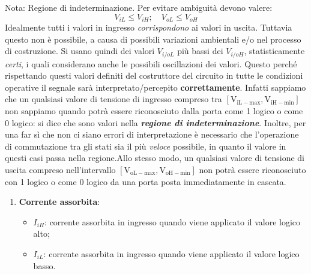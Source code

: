 \documentclass[
]{book}
\providecommand{\tightlist}{%
  \setlength{\itemsep}{0pt}\setlength{\parskip}{0pt}}
\begin{document}
\begin{orangebox}{Nota: Regione di indeterminazione.}
Per evitare ambiguità devono valere:
$$
V_{iL}\leq V_{iH}; \quad V_{oL}\leq V_{oH}
$$
Idealmente tutti i valori in ingresso \emph{corrispondono} ai valori in uscita. Tuttavia questo non è possibile, a causa di possibili variazioni ambientali e/o nel processo di costruzione. Si usano quindi dei valori $V_{i/o L}$ più bassi dei $V_{i/oH}$, statisticamente \emph{certi}, i quali considerano anche le possibili oscillazioni dei valori. Questo perché rispettando questi valori definiti del costruttore del circuito in tutte le condizioni operative il segnale sarà interpretato/percepito \textbf{correttamente}. \newline
Infatti sappiamo che un qualsiasi valore di tensione di ingresso compreso tra $\left[\mathrm{V}_{\mathrm{iL-max}},\mathrm{V}_{\mathrm{iH-min}}\right]$ non sappiamo quando potrà essere riconosciuto dalla porta come 1 logico o come 0 logico: si dice che sono valori nella \emph{\textbf{regione di indeterminazione}}. Inoltre, per una far sì che non ci siano errori di interpretazione è necessario che l'operazione di commutazione tra gli stati sia il più \emph{veloce} possibile, in quanto il valore in questi casi passa nella regione.\newline Allo stesso modo, un qualsiasi valore di tensione di uscita compreso nell'intervallo $[\mathrm{V}_{\mathrm{oL-max}},\mathrm{V}_{\mathrm{oH-min}}]$ non potrà essere riconosciuto con 1 logico o come 0 logico da una porta posta immediatamente in cascata.
\begin{minipage}{\linewidth}
\centering
{}%
\end{minipage}
\end{orangebox}

\begin{enumerate}
\def\labelenumi{\arabic{enumi})}
\setcounter{enumi}{2}
\tightlist
\item
  \textbf{Corrente assorbita}:

  \begin{itemize}
  \tightlist
  \item
    \(I_{iH}\): corrente assorbita in ingresso quando viene applicato il
    valore logico alto;
  \item
    \(I_{iL}\): corrente assorbita in ingresso quando viene applicato il
    valore logico basso.
  \end{itemize}
\end{enumerate}
\end{document}
